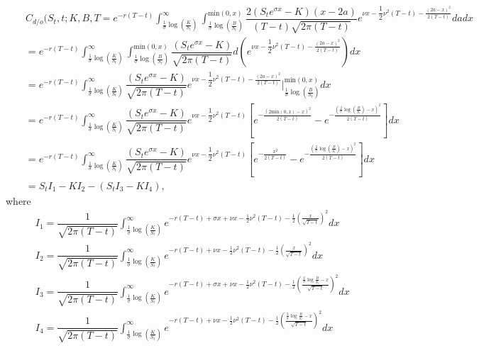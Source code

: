 \documentclass[12pt]{article}
\def\min{{\mbox{min}}}
\begin{document}
\begin{eqnarray*}
	&&C_{d/o}(S_t,t;K,B,T
	=e^{-r(T-t)}\displaystyle \int_{\frac{1}{\sigma}\log\left(\frac{K}{S_t}\right) }^{\infty}\displaystyle \int_{\frac{1}{\sigma}\log\left(\frac{B}{S_t}\right) }^{\min(0,x)}\dfrac{2(S_te^{\sigma x}-K)(x-2a)}{(T-t)\sqrt{2\pi (T-t)}}e^{\nu x-\dfrac12\nu^2(T-t)-\frac{(2a-x)^2}{2(T-t)}}dadx\\
	&&=e^{-r(T-t)}\displaystyle \int_{\frac{1}{\sigma}\log\left(\frac{K}{S_t}\right) }^{\infty}\displaystyle \int_{\frac{1}{\sigma}\log\left(\frac{B}{S_t}\right) }^{\min(0,x)}\dfrac{(S_te^{\sigma x}-K)}{\sqrt{2\pi (T-t)}}d(e^{\nu x-\dfrac12\nu^2(T-t)-\frac{(2a-x)^2}{2(T-t)}})dx\\
	&&=e^{-r(T-t)}\displaystyle \int_{\frac{1}{\sigma}\log\left(\frac{K}{S_t}\right) }^{\infty}\displaystyle \dfrac{(S_te^{\sigma x}-K)}{\sqrt{2\pi (T-t)}}e^{\nu x-\dfrac12\nu^2(T-t)-\frac{(2a-x)^2}{2(T-t)}}\bigg|_{\frac{1}{\sigma}\log\left(\frac{B}{S_t}\right)}^{\min(0,x)}dx\\
	&&=e^{-r(T-t)}\displaystyle \int_{\frac{1}{\sigma}\log\left(\frac{K}{S_t}\right) }^{\infty}\displaystyle \dfrac{(S_te^{\sigma x}-K)}{\sqrt{2\pi (T-t)}}e^{\nu x-\dfrac12\nu^2(T-t)}\left[e^{-\frac{(2\min(0,x)-x)^2}{2(T-t)}}-e^{-\frac{(\frac{2}{\sigma}\log\left(\frac{B}{S_t}\right)-x)^2}{2(T-t)}} \right]dx\\
	&&=e^{-r(T-t)}\displaystyle \int_{\frac{1}{\sigma}\log\left(\frac{K}{S_t}\right) }^{\infty}\displaystyle \dfrac{(S_te^{\sigma x}-K)}{\sqrt{2\pi (T-t)}}e^{\nu x-\dfrac12\nu^2(T-t)}\left[e^{-\frac{x^2}{2(T-t)}}-e^{-\frac{(\frac{2}{\sigma}\log\left(\frac{B}{S_t}\right)-x)^2}{2(T-t)}} \right]dx\\
	&&=S_tI_1-KI_2-(S_tI_3-KI_4),
\end{eqnarray*}
where
\begin{eqnarray*}
	&&I_1=\dfrac{1}{\sqrt{2\pi (T-t)}}\displaystyle \int_{\frac{1}{\sigma}\log\left(\frac{K}{S_t}\right) }^{\infty}e^{-r(T-t)+\sigma x+ \nu x-\frac{1}{2}\nu^2(T-t)-\frac{1}{2}\left(\frac{x}{\sqrt{T-t}}\right)^2}d x\\
	&&I_2=\dfrac{1}{\sqrt{2\pi (T-t)}}\displaystyle \int_{ \frac{1}{\sigma}\log\left(\frac{K}{S_t}\right) }^{\infty}e^{-r(T-t)+ \nu x-\frac{1}{2}\nu^2(T-t)-\frac{1}{2}\left(\frac{ x}{\sqrt{T-t}}\right)^2}d x\\
		&&I_3=\dfrac{1}{\sqrt{2\pi (T-t)}}\displaystyle \int_{ \frac{1}{\sigma}\log\left(\frac{K}{S_t}\right) }^{\infty}e^{-r(T-t)+\sigma  x+ \nu x-\frac{1}{2}\nu^2(T-t)-\frac{1}{2}\left(\frac{\frac{2}{\sigma}\log\frac{B}{S_t}- x}{\sqrt{T-t}}\right)^2}d x\\
	&&I_4=\dfrac{1}{\sqrt{2\pi (T-t)}}\displaystyle \int_{ \frac{1}{\sigma}\log\left(\frac{K}{S_t}\right) }^{\infty}e^{-r(T-t)+ \nu x-\frac{1}{2}\nu^2(T-t)-\frac{1}{2}\left(\frac{\frac{2}{\sigma}\log\frac{B}{S_t}- x}{\sqrt{T-t}}\right)^2}d x
\end{eqnarray*}
\end{document}
